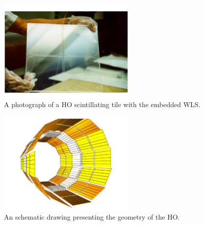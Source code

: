 \begin{figure}
 \centering
\includegraphics[width=0.6\textwidth]{CMS_DetectorFigures/HO_tile.pdf}
\caption{A photograph of a HO scintillating tile with the embedded WLS.\label{fig:HO_tile}}
\end{figure}
\begin{figure}
 \centering
\includegraphics[width=0.6\textwidth]{CMS_DetectorFigures/HO_Geometry.pdf}
\caption{An schematic drawing presenting the geometry of the HO.\label{fig:HO_Geometry}}
\end{figure}

